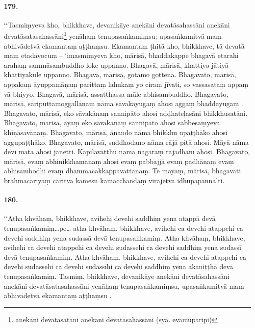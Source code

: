 \paragraph{179.} ‘‘Tasmiṃyeva kho, bhikkhave, devanikāye anekāni devatāsahassāni anekāni devatāsatasahassāni\footnote{anekāni devatāsatāni anekāni devatāsahassāni (syā. evamuparipi)} yenāhaṃ tenupasaṅkamiṃsu; upasaṅkamitvā maṃ abhivādetvā ekamantaṃ aṭṭhaṃsu. Ekamantaṃ ṭhitā kho, bhikkhave, tā devatā maṃ etadavocuṃ – ‘imasmiṃyeva kho, mārisā, bhaddakappe bhagavā etarahi arahaṃ sammāsambuddho loke uppanno. Bhagavā, mārisā, khattiyo jātiyā khattiyakule uppanno. Bhagavā, mārisā, gotamo gottena. Bhagavato, mārisā, appakaṃ āyuppamāṇaṃ parittaṃ lahukaṃ yo ciraṃ jīvati, so vassasataṃ appaṃ vā bhiyyo. Bhagavā, mārisā, assatthassa mūle abhisambuddho. Bhagavato, mārisā, sāriputtamoggallānaṃ nāma sāvakayugaṃ ahosi aggaṃ bhaddayugaṃ . Bhagavato, mārisā, eko sāvakānaṃ sannipāto ahosi aḍḍhateḷasāni bhikkhusatāni. Bhagavato, mārisā, ayaṃ eko sāvakānaṃ sannipāto ahosi sabbesaṃyeva khīṇāsavānaṃ. Bhagavato, mārisā, ānando nāma bhikkhu upaṭṭhāko ahosi aggupaṭṭhāko. Bhagavato, mārisā, suddhodano nāma rājā pitā ahosi. Māyā nāma devī mātā ahosi janetti. Kapilavatthu nāma nagaraṃ rājadhānī ahosi. Bhagavato, mārisā, evaṃ abhinikkhamanaṃ ahosi evaṃ pabbajjā evaṃ padhānaṃ evaṃ abhisambodhi evaṃ dhammacakkappavattanaṃ. Te mayaṃ, mārisā, bhagavati brahmacariyaṃ caritvā kāmesu kāmacchandaṃ virājetvā idhūpapannā’ti.

\paragraph{180.} ‘‘Atha khvāhaṃ, bhikkhave, avihehi devehi saddhiṃ yena atappā devā tenupasaṅkamiṃ…pe… atha khvāhaṃ, bhikkhave, avihehi ca devehi atappehi ca devehi saddhiṃ yena sudassā devā tenupasaṅkamiṃ. Atha khvāhaṃ, bhikkhave, avihehi ca devehi atappehi ca devehi sudassehi ca devehi saddhiṃ yena sudassī devā tenupasaṅkamiṃ. Atha khvāhaṃ, bhikkhave, avihehi ca devehi atappehi ca devehi sudassehi ca devehi sudassīhi ca devehi saddhiṃ yena akaniṭṭhā devā tenupasaṅkamiṃ. Tasmiṃ, bhikkhave, devanikāye anekāni devatāsahassāni anekāni devatāsatasahassāni yenāhaṃ tenupasaṅkamiṃsu, upasaṅkamitvā maṃ abhivādetvā ekamantaṃ aṭṭhaṃsu .

